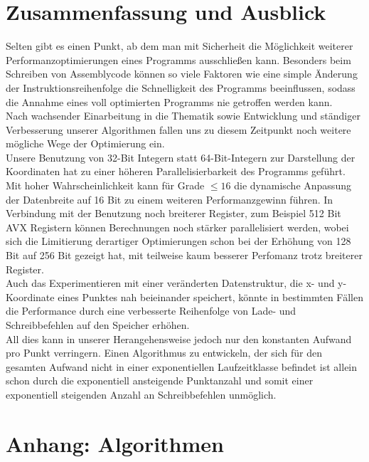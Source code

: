 \documentclass[course=erap]{aspdoc}
\begin{document}
\section{Zusammenfassung und Ausblick}
Selten gibt es einen Punkt, ab dem man mit Sicherheit die Möglichkeit weiterer Performanzoptimierungen eines Programms ausschließen kann. Besonders beim Schreiben von Assemblycode können so viele Faktoren wie eine simple Änderung der Instruktionsreihenfolge die Schnelligkeit des Programms beeinflussen, sodass die Annahme eines voll optimierten Programms nie getroffen werden kann. \\
Nach wachsender Einarbeitung in die Thematik sowie Entwicklung und ständiger Verbesserung unserer Algorithmen fallen uns zu diesem Zeitpunkt noch weitere mögliche Wege der Optimierung ein.\\
Unsere Benutzung von 32-Bit Integern statt 64-Bit-Integern zur Darstellung der Koordinaten hat zu einer höheren Parallelisierbarkeit des Programms geführt. Mit hoher Wahrscheinlichkeit kann für Grade $\leq 16$ die dynamische Anpassung der Datenbreite auf 16 Bit zu einem weiteren Performanzgewinn führen. In Verbindung mit der Benutzung noch breiterer Register, zum Beispiel 512 Bit AVX Registern können Berechnungen noch stärker parallelisiert werden, wobei sich die  Limitierung derartiger Optimierungen schon bei der Erhöhung von 128 Bit auf 256 Bit gezeigt hat, mit teilweise kaum besserer Perfomanz trotz breiterer Register. \\
Auch das Experimentieren mit einer veränderten Datenstruktur, die x- und y-Koordinate eines Punktes nah beieinander speichert, könnte in bestimmten Fällen die Performance durch eine verbesserte Reihenfolge von Lade- und Schreibbefehlen auf den Speicher erhöhen. \\
All dies kann in unserer Herangehensweise jedoch nur den konstanten Aufwand pro Punkt verringern. Einen Algorithmus zu entwickeln, der sich für den gesamten Aufwand nicht in einer exponentiellen Laufzeitklasse befindet ist allein schon durch die exponentiell ansteigende Punktanzahl und somit einer exponentiell steigenden Anzahl an Schreibbefehlen unmöglich.
\FloatBarrier
\section{Anhang: Algorithmen}
\end{document}
